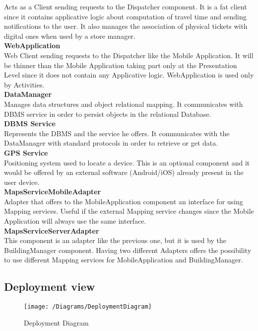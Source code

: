 Acts as a Client sending requests to the Dispatcher component. It is a fat client since it contains applicative logic about computation of travel time and sending notifications to the user. It also manages the association of physical tickets with digital ones when used by a store manager.\\
\textbf{WebApplication}\\
Web Client sending requests to the Dispatcher like the Mobile Application. It will be thinner than the Mobile Application taking part only at the Presentation Level since it does not contain any Applicative logic. WebApplication is used only by Activities.\\
\textbf{DataManager}\\
Manages data structures and object relational mapping. It communicates with DBMS service in order to persist objects in the relational Database. \\
\textbf{DBMS Service}\\
Represents the DBMS and the service he offers. It communicates with the DataManager with standard protocols in order to retrieve or get data.\\
\textbf{GPS Service}\\
Positioning system used to locate a device. This is an optional component and it would be offered by an external software (Android/iOS) already present in the user device.\\
\textbf{MapsServiceMobileAdapter}\\
Adapter that offers to the MobileApplication component an interface for using Mapping services. Useful if the external Mapping service changes since the Mobile Application will always use the same interface.\\
\textbf{MapsServiceServerAdapter}\\
This component is an adapter like the previous one, but it is used by the BuildingManager component. Having two different Adapters offers the possibility to use different Mapping services for MobileApplication and BuildingManager.

\subsection{Deployment view}
\begin{figure}[H]
	\centering
	\texttt{[image: /Diagrams/DeploymentDiagram]}
	\caption{Deployment Diagram}
\end{figure}

